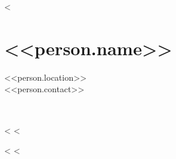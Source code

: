 <%



\section{<<person.name>>}
<<person.location>>\\
<<person.contact>>

\vspace{0.05\textheight}
​
\hspace*{-\parindent}
\begin{minipage}[t]{0.6\textwidth}
<%
<%
\end{minipage}
\hspace*{-\parindent}
\hspace{0.05\textwidth}
\begin{minipage}[t]{0.395\textwidth}
<%
<%
\end{minipage}

